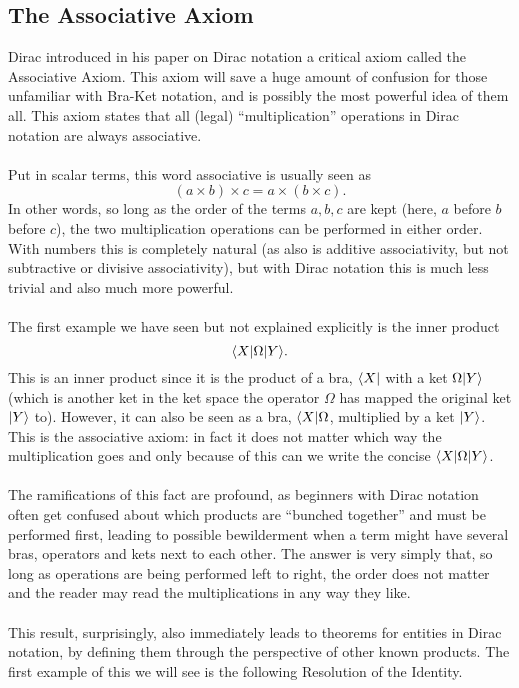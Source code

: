\subsection{The Associative Axiom}
Dirac introduced in his paper on Dirac notation a critical axiom called the Associative Axiom. This axiom will save a huge amount of confusion for those unfamiliar with Bra-Ket notation, and is possibly the most powerful idea of them all. This axiom states that all (legal) ``multiplication'' operations in Dirac notation are always associative.
\\\\
Put in scalar terms, this word associative is usually seen as
$$
(a\times b)\times c = a \times (b\times c).
$$
In other words, so long as the order of the terms $a,b,c$ are kept (here, $a$ before $b$ before $c$), the two multiplication operations can be performed in either order. With numbers this is completely natural (as also is additive associativity, but not subtractive or divisive associativity), but with Dirac notation this is much less trivial and also much more powerful.
\\\\
The first example we have seen but not explained explicitly is the inner product 
$$
\langle X|{\Omega}|Y\rangle.
$$
This is an inner product since it is the product of a bra, $\langle X|$ with a ket $\Omega|Y\rangle$ (which is another ket in the ket space the operator $\Omega$ has mapped the original ket $|Y\rangle$ to). However, it can also be seen as a bra, $\langle X|\Omega$, multiplied by a ket $|Y\rangle$. This is the associative axiom: in fact it does not matter which way the multiplication goes and only because of this can we write the concise $\langle X|{\Omega}|Y\rangle$.
\\\\
The ramifications of this fact are profound, as beginners with Dirac notation often get confused about which products are ``bunched together'' and must be performed first, leading to possible bewilderment when a term might have several bras, operators and kets next to each other. The answer is very simply that, so long as operations are being performed left to right, the order does not matter and the reader may read the multiplications in any way they like. 
\\\\
This result, surprisingly, also immediately leads to theorems for entities in Dirac notation, by defining them through the perspective of other known products. The first example of this we will see is the following Resolution of the Identity.
